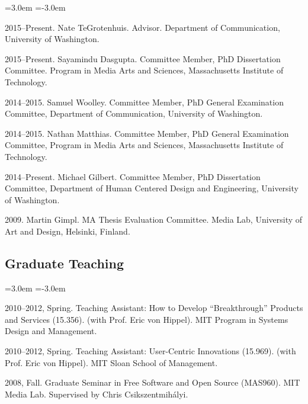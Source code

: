 \documentclass[10pt]{article}
\newenvironment{cvlist}{
\begin{list}{}{\leftmargin=3.0em \itemindent=-3.0em}
  \setlength{\itemsep}{0pt}
  \setlength{\parskip}{0em}
  \setlength{\parsep}{1em}
  \setlength{\parindent}{0em}}
{\vspace{1em}
\end{list}}
\begin{document}
\begin{cvlist}
\item 2015--Present. Nate TeGrotenhuis. Advisor. Department of Communication, University of Washington.
\item 2015--Present. Sayamindu Dasgupta. Committee Member, PhD Dissertation Committee. Program in Media Arts and Sciences, Massachusetts Institute of Technology.
\item 2014--2015. Samuel Woolley. Committee Member, PhD General Examination Committee, Department of Communication, University of Washington.
\item 2014--2015. Nathan Matthias. Committee Member, PhD General Examination Committee, Program in Media Arts and Sciences, Massachusetts Institute of Technology.
\item 2014--Present. Michael Gilbert. Committee Member, PhD Dissertation Committee, Department of Human Centered Design and Engineering, University of Washington.
\item 2009. Martin Gimpl. MA Thesis Evaluation Committee. Media Lab, University of Art and Design, Helsinki, Finland.
\end{cvlist}

\subsection{Graduate Teaching}
\begin{cvlist}
\item 2010--2012, Spring. Teaching Assistant: How to Develop ``Breakthrough'' Products and Services (15.356). (with Prof. Eric von Hippel). MIT Program in Systems Design and Management.
\item 2010--2012, Spring. Teaching Assistant: User-Centric Innovations (15.969). (with Prof. Eric von Hippel). MIT Sloan School of Management.
\item 2008, Fall. Graduate Seminar in Free Software and Open Source (MAS960). MIT Media Lab. Supervised by Chris Csikszentmihályi.
\end{cvlist}



\end{document}

